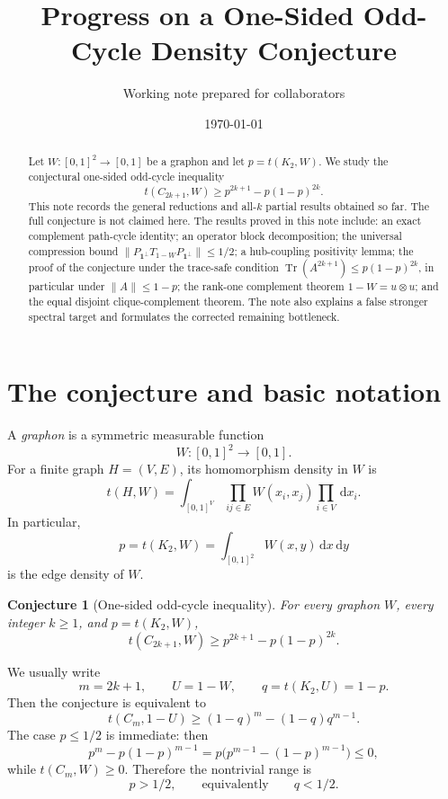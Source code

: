 \documentclass[11pt]{article}
\title{Progress on a One-Sided Odd-Cycle Density Conjecture}
\author{Working note prepared for collaborators}
\date{\today}
\newtheorem{conjecture}[theorem]{Conjecture}
\theoremstyle{definition}
\theoremstyle{remark}
\newcommand{\one}{\mathbf 1}
\newcommand{\Tr}{\operatorname{Tr}}
\newcommand{\dd}{\,\mathrm d}
\newcommand{\0}{\mathbf 0}
\begin{document}
\maketitle

\begin{abstract}
Let $W:[0,1]^2\to[0,1]$ be a graphon and let $p=t(K_2,W)$.  We study the conjectural one-sided odd-cycle inequality
\[
        t(C_{2k+1},W)\ge p^{2k+1}-p(1-p)^{2k}.
\]
This note records the general reductions and all-$k$ partial results obtained so far.  The full conjecture is not claimed here.  The results proved in this note include: an exact complement path-cycle identity; an operator block decomposition; the universal compression bound $\|P_{\one^\perp}T_{1-W}P_{\one^\perp}\|\le 1/2$; a hub-coupling positivity lemma; the proof of the conjecture under the trace-safe condition $\Tr(A^{2k+1})\le p(1-p)^{2k}$, in particular under $\|A\|\le 1-p$; the rank-one complement theorem $1-W=u\otimes u$; and the equal disjoint clique-complement theorem.  The note also explains a false stronger spectral target and formulates the corrected remaining bottleneck.
\end{abstract}

\tableofcontents

\section{The conjecture and basic notation}

A \emph{graphon} is a symmetric measurable function
\[
        W:[0,1]^2\to[0,1].
\]
For a finite graph $H=(V,E)$, its homomorphism density in $W$ is
\[
        t(H,W)=\int_{[0,1]^V}\prod_{ij\in E} W(x_i,x_j)\prod_{i\in V}\dd x_i.
\]
In particular,
\[
        p=t(K_2,W)=\int_{[0,1]^2} W(x,y)\dd x\dd y
\]
is the edge density of $W$.

\begin{conjecture}[One-sided odd-cycle inequality]\label{conj:main}
For every graphon $W$, every integer $k\ge1$, and $p=t(K_2,W)$,
\[
        t(C_{2k+1},W)\ge p^{2k+1}-p(1-p)^{2k}.
\]
\end{conjecture}

We usually write
\[
        m=2k+1,
        \qquad
        U=1-W,
        \qquad
        q=t(K_2,U)=1-p.
\]
Then the conjecture is equivalent to
\begin{equation}\label{eq:complement-form}
        t(C_m,1-U)\ge (1-q)^m-(1-q)q^{m-1}.
\end{equation}
The case $p\le 1/2$ is immediate: then
\[
        p^m-p(1-p)^{m-1}
        =p\bigl(p^{m-1}-(1-p)^{m-1}\bigr)\le0,
\]
while $t(C_m,W)\ge0$.  Therefore the nontrivial range is
\[
        p>1/2,
        \qquad\text{equivalently}\qquad
        q<1/2.
\]
\end{document}
